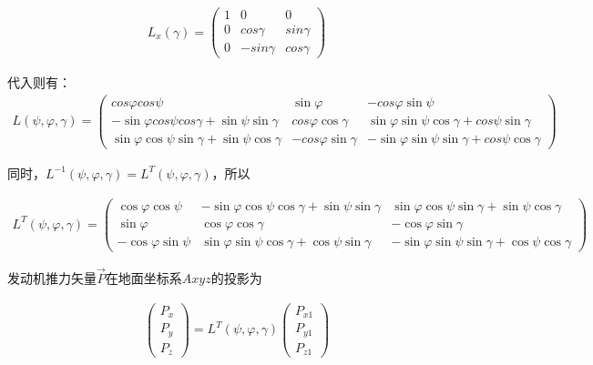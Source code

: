 \documentclass[UTF8]{ctexart}
\begin{document}
\begin{align}
    L_{x} \left(\gamma\right)
    =
    \begin{pmatrix}
        1 & 0          & 0
        \\
        0 & cos\gamma  & sin\gamma
        \\
        0 & -sin\gamma & cos\gamma
    \end{pmatrix}
\end{align}

代入则有：
\begin{align}
    L \left(\psi , \varphi , \gamma\right)
    =
    \begin{pmatrix}
        cos\varphi cos\psi                                & \sin\varphi           & -cos\varphi\sin\psi
        \\
        -\sin\varphi cos\psi cos\gamma+\sin\psi\sin\gamma & cos\varphi\cos\gamma  & \sin\varphi\sin\psi\cos\gamma+cos\psi\sin\gamma
        \\
        \sin\varphi\cos\psi\sin\gamma+\sin\psi\cos\gamma  & -cos\varphi\sin\gamma & -\sin\varphi\sin\psi\sin\gamma+cos\psi\cos\gamma
    \end{pmatrix}
\end{align}

同时，$L^{-1} \left(\psi , \varphi , \gamma\right) = L^{T} \left(\psi , \varphi , \gamma\right)$，所以

\begin{align}
    L^{T} \left(\psi , \varphi , \gamma\right)
    =
    \begin{pmatrix}
        \cos\varphi\cos\psi  & -\sin\varphi\cos\psi\cos\gamma+\sin\psi\sin\gamma & \sin\varphi\cos\psi\sin\gamma+\sin\psi\cos\gamma
        \\
        \sin\varphi          & \cos\varphi\cos\gamma                             & -\cos\varphi\sin\gamma
        \\
        -\cos\varphi\sin\psi & \sin\varphi\sin\psi\cos\gamma+\cos\psi\sin\gamma  & -\sin\varphi\sin\psi\sin\gamma+\cos\psi\cos\gamma
    \end{pmatrix}
\end{align}

发动机推力矢量$\vec{P}$在地面坐标系$Axyz$的投影为

\begin{align}
    \begin{pmatrix}
        P_{x} \\
        P_{y} \\
        P_{z}
    \end{pmatrix}
    =
    L^{T} \left(\psi , \varphi , \gamma\right)
    \begin{pmatrix}
        P_{x1} \\
        P_{y1} \\
        P_{z1}
    \end{pmatrix}
\end{align}
\end{document}
